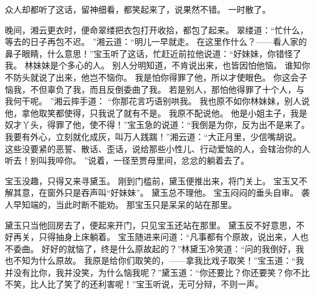 众人却都听了这话，留神细看，都笑起来了，说果然不错。
一时散了。
\par
晚间，湘云更衣时，便命翠缕把衣包打开收拾，都包了起来。
翠缕道：“忙什么，等去的日子再包不迟。
”湘云道：“明儿一早就走。
在这里作什么？——看人家的鼻子眼睛，什么意思！”宝玉听了这话，忙赶近前拉他说道：“好妹妹，你错怪了我。
林妹妹是个多心的人。
别人分明知道，不肯说出来，也皆因怕他恼。
谁知你不防头就说了出来，他岂不恼你。
我是怕你得罪了他，所以才使眼色。
你这会子恼我，不但辜负了我，而且反倒委曲了我。
若是别人，那怕他得罪了十个人，与我何干呢。
”湘云摔手道：
“你那花言巧语别哄我。
我也原不如你林妹妹，别人说他，拿他取笑都使得，只我说了就有不是。
我原不配说他。
他是小姐主子，我是奴才丫头，得罪了他，使不得！”宝玉急的说道：“我倒是为你，反为出不是来了。
我要有外心，立刻就化成灰，叫万人践踹！”湘云道：“大正月里，少信嘴胡说。
这些没要紧的恶誓、散话、歪话，说给那些小性儿、行动爱恼的人，会辖治你的人听去！别叫我啐你。
”说着，一径至贾母里间，忿忿的躺着去了。
\par
宝玉没趣，只得又来寻黛玉。
刚到门槛前，黛玉便推出来，将门关上。
宝玉又不解其意，在窗外只是吞声叫“好妹妹”。
黛玉总不理他。
宝玉闷闷的垂头自审。
袭人早知端的，当此时断不能劝。
那宝玉只是呆呆的站在那里。
\par
黛玉只当他回房去了，便起来开门，只见宝玉还站在那里。
黛玉反不好意思，不好再关，只得抽身上床躺着。
宝玉随进来问道：“凡事都有个原故，说出来，人也不委曲。
好好的就恼了，终是什么原故起的？”林黛玉冷笑道：“问的我倒好，我也不知为什么原故。
我原是给你们取笑的，——拿我比戏子取笑！”宝玉道：“我并没有比你，我并没笑，为什么恼我呢？”黛玉道：“你还要比？你还要笑？你不比不笑，比人比了笑了的还利害呢！”宝玉听说，无可分辩，不则一声。
\par
